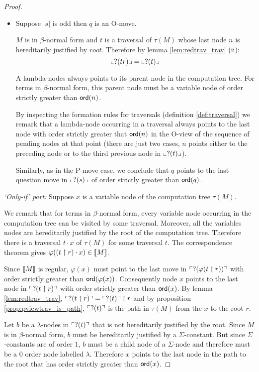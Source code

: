 \begin{proof}
\begin{itemize}
\item Suppose $|s|$ is odd then $q$ is an O-move.

$M$ is in $\beta$-normal form and $t$ is a traversal of $\tau(M)$
whose last node $n$ is hereditarily justified by $root$. Therefore  by lemma \ref{lem:redtrav_trav} (ii):
\begin{equation}
 \llcorner ?(tr) \lrcorner = \llcorner ?(t) \lrcorner \label{eq:oview_r}
\end{equation}


A lambda-nodes always points to its parent node in the computation
tree. For terms in $\beta$-normal form, this parent node must be a
variable node of order strictly greater than ${\sf ord}(n)$.

By inspecting the formation rules for traversals (definition
\ref{def:traversal}) we remark that a lambda-node occurring in a
traversal always points to the last node with order strictly greater
that ${\sf ord}(n)$ in the O-view of the sequence of pending nodes at
that point (there are just two cases, $n$ points either to the
preceding node or to the third previous node in $\llcorner ?(t) \lrcorner$).

Similarly, as in the P-move case, we conclude that $q$ points to the
last question move in $\llcorner ?(s) \lrcorner$ of order strictly greater than
${\sf ord}(q)$.
\end{itemize}

\noindent  \emph{`Only-if' part:}
Suppose $x$ is a variable node of the computation tree $\tau(M)$.

We remark that for terms in $\beta$-normal form, every variable node occurring in the computation tree can be visited by some traversal.
Moreover, all the variables nodes are hereditarily justified by the root of the computation tree.
Therefore there is a traversal $t \cdot x$ of $\tau(M)$ for some traversal $t$.
The correspondence theorem gives $\varphi((t \upharpoonright r) \cdot x) \in {[\![M ]\!]}$.

Since ${[\![ M ]\!]}$ is regular, $\varphi(x)$ must point to the last move in $\ulcorner ?(\varphi(t \upharpoonright r)) \urcorner$ with
order strictly greater than ${\sf ord}(\varphi(x))$.
Consequently node $x$ points to the last node in $\ulcorner ?(t \upharpoonright r) \urcorner$ with
order strictly greater than ${\sf ord}(x)$.
By lemma \ref{lem:redtrav_trav}, $\ulcorner ?(t \upharpoonright r) \urcorner = \ulcorner ?(t) \urcorner \upharpoonright r$
and by proposition \ref{prop:pviewtrav_is_path}, $\ulcorner ?(t) \urcorner$ is
the path in $\tau(M)$ from the $x$ to the root $r$.

Let $b$ be a $\lambda$-nodes in $\ulcorner ?(t) \urcorner$ that is not hereditarily justified by the root.
Since $M$ is in $\beta$-normal form, $b$ must be hereditarily justified by a $\Sigma$-constant.
But since $\Sigma$-constants are of order $1$, $b$ must be a child node of a $\Sigma$-node and therefore must be a $0$ order node labelled $\lambda$.
Therefore $x$ points to the last node in the path to the root that has order strictly greater than ${\sf ord}(x)$.
\end{proof}



